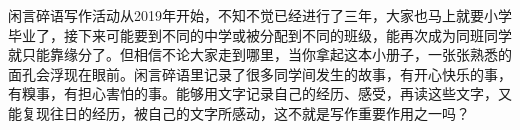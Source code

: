 \markdownRendererDocumentBegin
{}\markdownRendererInterblockSeparator
{}闲言碎语写作活动从2019年开始，不知不觉已经进行了三年，大家也马上就要小学毕业了，接下来可能要到不同的中学或被分配到不同的班级，能再次成为同班同学就只能靠缘分了。但相信不论大家走到哪里，当你拿起这本小册子，一张张熟悉的面孔会浮现在眼前。闲言碎语里记录了很多同学间发生的故事，有开心快乐的事，有糗事，有担心害怕的事。能够用文字记录自己的经历、感受，再读这些文字，又能复现往日的经历，被自己的文字所感动，这不就是写作重要作用之一吗？\markdownRendererDocumentEnd